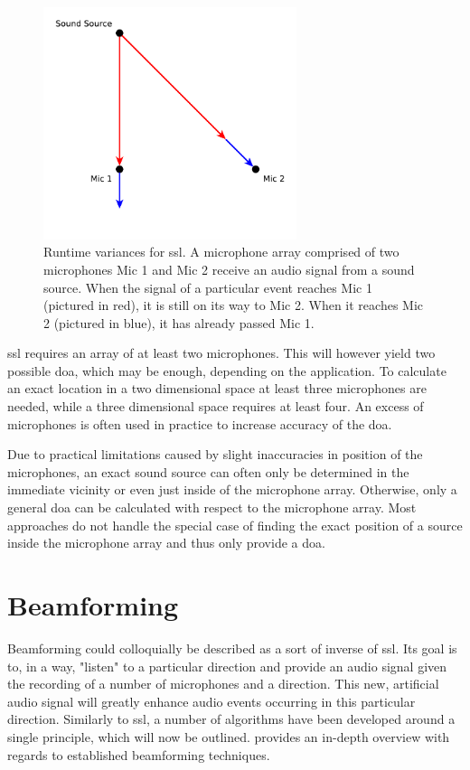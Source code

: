 \begin{figure}[]
	\centering
	\includegraphics[width=0.66\textwidth]{diagrams/basics_ssl.pdf}
	\caption{Runtime variances for \gls{ssl}.
		A microphone array comprised of two microphones Mic 1 and Mic 2 receive an audio signal from a sound source.
		When the signal of a particular event reaches Mic 1 (pictured in red), it is still on its way to Mic 2.
		When it reaches Mic 2 (pictured in blue), it has already passed Mic 1.}
	\label{pic:basics:ssl}
\end{figure}

\gls{ssl} requires an array of at least two microphones.
This will however yield two possible \gls{doa}, which may be enough, depending on the application.%
To calculate an exact location in a two dimensional space at least three microphones are needed, while a three dimensional space requires at least four.
An excess of microphones is often used in practice to increase accuracy of the \gls{doa}.

Due to practical limitations caused by slight inaccuracies in position of the microphones, an exact sound source can often only be determined in the immediate vicinity or even just inside of the microphone array.
Otherwise, only a general \gls{doa} can be calculated with respect to the microphone array.
Most approaches do not handle the special case of finding the exact position of a source inside the microphone array and thus only provide a \gls{doa}.


\section{Beamforming}
Beamforming could colloquially be described as a sort of inverse of \gls{ssl}.
Its goal is to, in a way, "listen" to a particular direction and provide an audio signal given the recording of a number of microphones and a direction.
This new, artificial audio signal will greatly enhance audio events occurring in this particular direction.
Similarly to \gls{ssl}, a number of algorithms have been developed around a single principle, which will now be outlined.
\cite{1239145} provides an in-depth overview with regards to established beamforming techniques.

